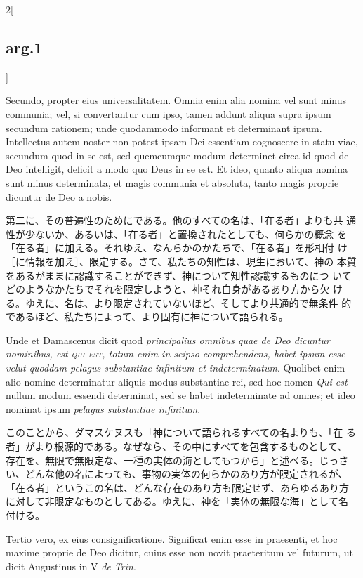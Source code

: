 \documentclass[paper=a4paper,fontsize=10pt,jafontsize=9pt,titlepage]{jlreq}
\begin{document}
\begin{paracol}{2}[\subsection{arg.1}]
\switchcolumn*

Secundo, propter eius universalitatem. Omnia enim alia nomina vel sunt
minus communia; vel, si convertantur cum ipso, tamen addunt aliqua
supra ipsum secundum rationem; unde quodammodo informant et
determinant ipsum. Intellectus autem noster non potest ipsam Dei
essentiam cognoscere in statu viae, secundum quod in se est, sed
quemcumque modum determinet circa id quod de Deo intelligit, deficit a
modo quo Deus in se est. Et ideo, quanto aliqua nomina sunt minus
determinata, et magis communia et absoluta, tanto magis proprie
dicuntur de Deo a nobis.

\switchcolumn

第二に、その普遍性のためにである。他のすべての名は、「在る者」よりも共
通性が少ないか、あるいは、「在る者」と置換されたとしても、何らかの概念
を「在る者」に加える。それゆえ、なんらかのかたちで、「在る者」を形相付
け［に情報を加え］、限定する。さて、私たちの知性は、現生において、神の
本質をあるがままに認識することができず、神について知性認識するものにつ
いてどのようなかたちでそれを限定しようと、神それ自身があるあり方から欠
ける。ゆえに、名は、より限定されていないほど、そしてより共通的で無条件
的であるほど、私たちによって、より固有に神について語られる。

\switchcolumn*

Unde et Damascenus dicit quod {\itshape principalius omnibus quae de
Deo dicuntur nominibus, est {\scshape qui est}, totum enim in seipso
comprehendens, habet ipsum esse velut quoddam pelagus substantiae
infinitum et indeterminatum}. Quolibet enim alio nomine determinatur
aliquis modus substantiae rei, sed hoc nomen {\itshape Qui est} nullum
modum essendi determinat, sed se habet indeterminate ad omnes; et ideo
nominat ipsum {\itshape pelagus substantiae infinitum}.

\switchcolumn

このことから、ダマスケヌスも「神について語られるすべての名よりも、「在
る者」がより根源的である。なぜなら、その中にすべてを包含するものとして、
存在を、無限で無限定な、一種の実体の海としてもつから」と述べる。じっさ
い、どんな他の名によっても、事物の実体の何らかのあり方が限定されるが、
「在る者」というこの名は、どんな存在のあり方も限定せず、あらゆるあり方
に対して非限定なものとしてある。ゆえに、神を「実体の無限な海」として名
付ける。

\switchcolumn*

Tertio vero, ex eius consignificatione. Significat enim esse in
praesenti, et hoc maxime proprie de Deo dicitur, cuius esse non novit
praeteritum vel futurum, ut dicit Augustinus in V {\itshape de Trin}.


\end{paracol}
\end{document}
